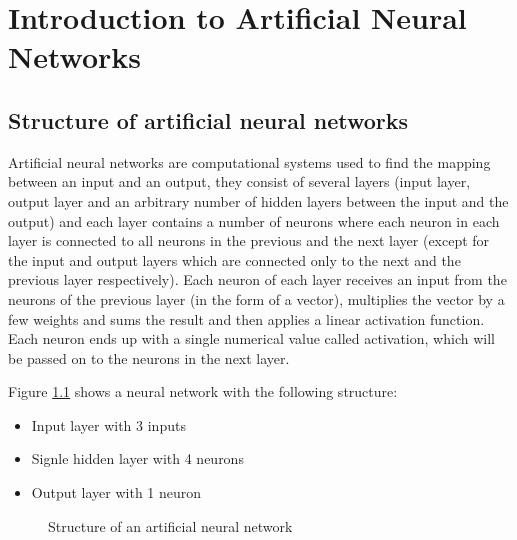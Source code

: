 \chapter{Introduction to Artificial Neural Networks}

\section{Structure of artificial neural networks}
Artificial neural networks are computational systems used to find the mapping between an input and an output, they consist of several layers (input layer, output layer and an arbitrary number of hidden layers between the input and the output) and each layer contains a number of neurons where each neuron in each layer is connected to all neurons in the previous and the next layer (except for the input and output layers which are connected only to the next and the previous layer respectively).
Each neuron of each layer receives an input from the neurons of the previous layer (in the form of a vector), multiplies the vector by a few weights and sums the result and then applies a linear activation function. Each neuron ends up with a single numerical value called activation, which will be passed on to the neurons in the next layer.

Figure \ref{fig:neural-network-structure} shows a neural network with the following structure:

\begin{itemize}
    \item Input layer with 3 inputs
    \item Signle hidden layer with 4 neurons
    \item Output layer with 1 neuron
\end{itemize}

\begin{figure}[h]
    \centering
	
    \caption{Structure of an artificial neural network}
    \label{fig:neural-network-structure}
\end{figure}

